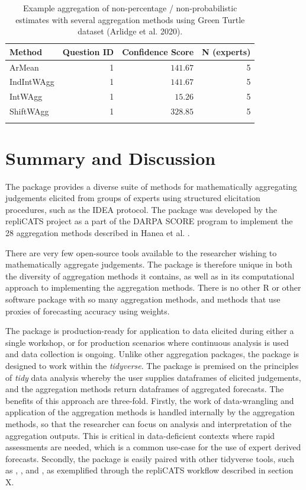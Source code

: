\documentclass[article]{jss}
\begin{document}
\hypertarget{tbl-BYO-data-aggregate}{}
\begin{longtable}{lrrr}

\toprule
Method & Question ID & Confidence Score & N (experts) \\ 
\midrule
ArMean & 1 & $141.67$ & 5 \\ 
IndIntWAgg & 1 & $141.67$ & 5 \\ 
IntWAgg & 1 & $15.26$ & 5 \\ 
ShiftWAgg & 1 & $328.85$ & 5 \\ 
\bottomrule
\caption{\label{tbl-BYO-data-aggregate}Example aggregation of non-percentage / non-probabilistic estimates with
several aggregation methods using Green Turtle dataset (Arlidge et al.
2020). }\tabularnewline
\end{longtable}

\hypertarget{sec-summary}{%
\section{Summary and Discussion}\label{sec-summary}}

The  package provides a diverse suite of methods for
mathematically aggregating judgements elicited from groups of experts
using structured elicitation procedures, such as the IDEA protocol. The
 package was developed by the repliCATS project as a part
of the DARPA SCORE program to implement the 28 aggregation methods
described in Hanea et al. \citeyearpar{Hanea2021}.

There are very few open-source tools available to the researcher wishing
to mathematically aggregate judgements. The  package is
therefore unique in both the diversity of aggregation methods it
contains, as well as in its computational approach to implementing the
aggregation methods. There is no other R or other software package with
so many aggregation methods, and methods that use proxies of forecasting
accuracy using weights.

The  package is production-ready for application to data
elicited during either a single workshop, or for production scenarios
where continuous analysis is used and data collection is ongoing. Unlike
other aggregation packages, the  package is designed to
work within the \emph{tidyverse}. The package is premised on the
principles of \emph{tidy} data analysis whereby the user supplies
dataframes of elicited judgements, and the aggregation methods return
dataframes of aggregated forecasts. The benefits of this approach are
three-fold. Firstly, the work of data-wrangling and application of the
aggregation methods is handled internally by the aggregation methods, so
that the researcher can focus on analysis and interpretation of the
aggregation outputs. This is critical in data-deficient contexts where
rapid assessments are needed, which is a common use-case for the use of
expert derived forecasts. Secondly, the  package is easily
paired with other tidyverse tools, such as , , and
, as exemplified through the repliCATS workflow described
in section X.
\end{document}
